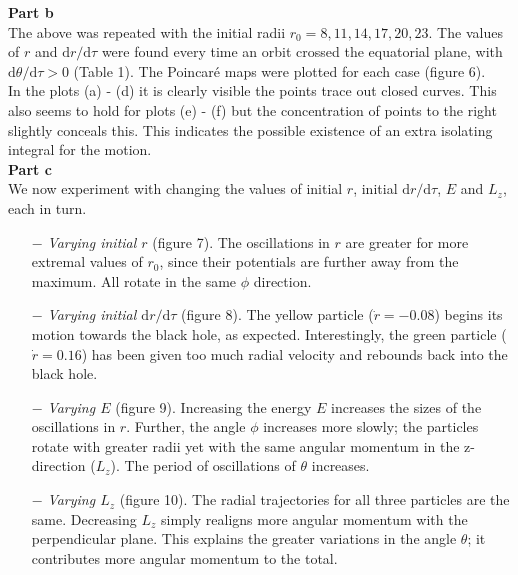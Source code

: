 \documentclass[12pt]{extarticle}
\begin{document}
\textbf{Part b}\\ 

The above was repeated with the initial radii $r_0 = 8,11,14,17,20,23$. The values of $r$ and $\mathrm{d} r/\mathrm{d} \tau$ were found every time an orbit crossed the equatorial plane, with $\mathrm{d} \theta /\mathrm{d}\tau > 0$ (Table 1). The Poincar\'e maps were plotted for each case (figure 6).\\

In the plots (a) - (d) it is clearly visible the points trace out closed curves. This also seems to hold for plots (e) - (f) but the concentration of points to the right slightly conceals this. This  indicates the possible existence of an extra isolating integral for the motion. \\

\textbf{Part c}\\ 

We now experiment with changing the values of initial $r$, initial $\mathrm{d} r/\mathrm{d} \tau$, $E$ and $L_z$, each in turn.

\begin{itemize}
\item[$-$]\textit{Varying initial $r$} (figure 7). The oscillations in $r$ are greater for more extremal values of $r_0$, since their potentials are further away from the maximum. All rotate in the same $\phi$ direction. 

\item[$-$]\textit{Varying initial $\mathrm{d} r/\mathrm{d} \tau$} (figure 8). The yellow particle ($\dot{r} = -0.08$) begins its motion towards the black hole, as expected. Interestingly, the green particle ($\dot{r} = 0.16$) has been given too much radial velocity and rebounds back into the black hole. 

\item[$-$] \textit{Varying $E$} (figure 9). Increasing the energy $E$ increases the sizes of the oscillations in $r$. Further, the angle $\phi$ increases more slowly; the particles rotate with greater radii yet with the same angular momentum in the z-direction ($L_z$). The period of oscillations of $\theta$ increases.

\item[$-$] \textit{Varying $L_z$} (figure 10). The radial trajectories for all three particles are the same. Decreasing $L_z$ simply realigns more angular momentum with the perpendicular plane. This explains the greater variations in the angle $\theta$; it contributes more angular momentum to the total.\\

\end{itemize}
\end{document}
